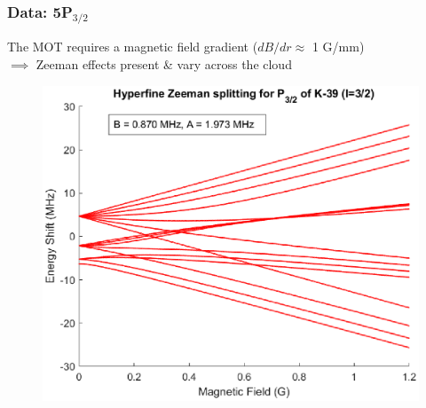 \documentclass{beamer}
\theoremstyle{definition}
\begin{document}
\begin{frame}
\frametitle{Data: 5P$_{\text{3/2}}$}

The MOT requires a magnetic field gradient ($dB/dr \approx$ 1 G/mm) \\
$\implies$ Zeeman effects present \& vary across the cloud



\begin{figure}[!htb]
	\centering
	\includegraphics[height=0.7\textheight]{Zeeman_hfs.eps}
\end{figure}
\end{frame}
\end{document}
